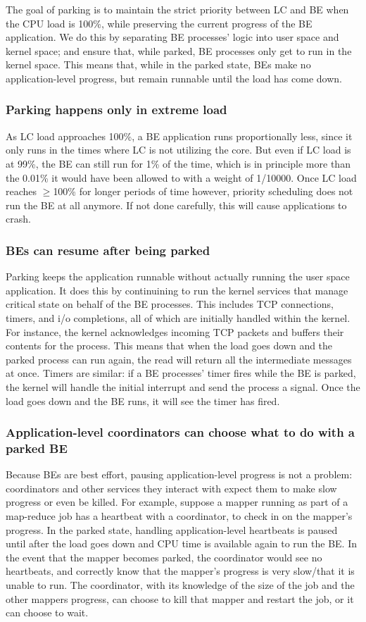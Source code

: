 The goal of parking is to maintain the strict priority between LC and BE when
the CPU load is 100\%, while preserving the current progress of the BE
application. We do this by separating BE processes' logic into user space and
kernel space; and ensure that, while parked, BE processes only get to run in the
kernel space. This means that, while in the parked state, BEs make no
application-level progress, but remain runnable until the load has come down.

\subsubsection{Parking happens only in extreme load}
As LC load approaches 100\%, a BE application runs proportionally less, since it
only runs in the times where LC is not utilizing the core. But even if LC load
is at 99\%, the BE can still run for 1\% of the time, which is in principle more
than the 0.01\% it would have been allowed to with a weight of 1/10000. Once LC
load reaches $\geq$100\% for longer periods of time however, priority scheduling
does not run the BE at all anymore. If not done carefully, this will cause
applications to crash.

\subsubsection{BEs can resume after being parked }
Parking keeps the application runnable without actually running the user space
application. It does this by continuining to run the kernel services that manage
critical state on behalf of the BE processes. This includes TCP connections,
timers, and i/o completions, all of which are initially handled within the
kernel. For instance, the kernel acknowledges incoming TCP packets and buffers
their contents for the process. This means that when the load goes down and the
parked process can run again, the read will return all the intermediate messages
at once. Timers are similar: if a BE processes' timer fires while the BE is
parked, the kernel will handle the initial interrupt and send the process a
signal. Once the load goes down and the BE runs, it will see the timer has
fired.

\subsubsection{Application-level coordinators can choose what to do with a
parked BE} Because BEs are best effort, pausing application-level progress is
not a problem: coordinators and other services they interact with expect them to
make slow progress or even be killed. For example, suppose a mapper running as
part of a map-reduce job has a heartbeat with a coordinator, to check in on the
mapper's progress. In the parked state, handling application-level heartbeats is
paused until after the load goes down and CPU time is available again to run the
BE. In the event that the mapper becomes parked, the coordinator would see no
heartbeats, and correctly know that the mapper's progress is very slow/that it
is unable to run. The coordinator, with its knowledge of the size of the job and
the other mappers progress, can choose to kill that mapper and restart the job,
or it can choose to wait.

